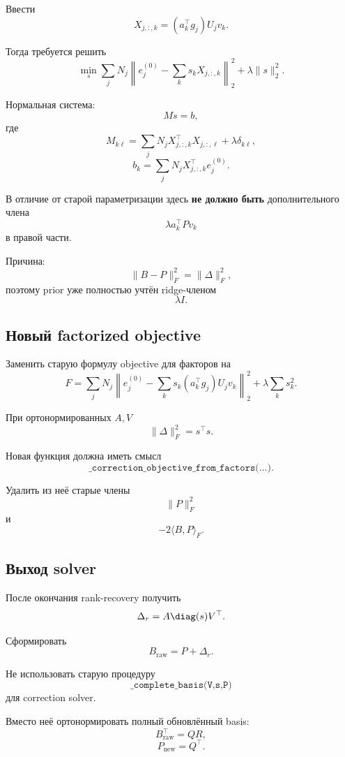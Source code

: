 Ввести
\[
    X_{j,:,k}
    =
    (a_k^\top g_j)U_jv_k.
\]

Тогда требуется решить
\[
\boxed{
    \min_s
    \sum_j
    N_j
    \left\|
        e_j^{(0)}
        -
        \sum_k s_kX_{j,:,k}
    \right\|_2^2
    +
    \lambda\|s\|_2^2.
}
\]

Нормальная система:
\[
\boxed{
    Ms=b,
}
\]
где
\[
    M_{k\ell}
    =
    \sum_j
    N_j
    X_{j,:,k}^\top X_{j,:,\ell}
    +
    \lambda\delta_{k\ell},
\]
\[
\boxed{
    b_k
    =
    \sum_j
    N_j
    X_{j,:,k}^\top e_j^{(0)}.
}
\]

В отличие от старой параметризации здесь
\textbf{не должно быть} дополнительного члена
\[
    \lambda a_k^\top Pv_k
\]
в правой части.

Причина:
\[
    \|B-P\|_F^2
    =
    \|\Delta\|_F^2,
\]
поэтому prior уже полностью учтён ridge-членом
\[
    \lambda I.
\]

\subsection{Новый factorized objective}

Заменить старую формулу objective для факторов на
\[
\boxed{
    F
    =
    \sum_j
    N_j
    \left\|
        e_j^{(0)}
        -
        \sum_k
        s_k
        (a_k^\top g_j)
        U_jv_k
    \right\|_2^2
    +
    \lambda
    \sum_k s_k^2.
}
\]

При ортонормированных $A,V$
\[
    \|\Delta\|_F^2
    =
    s^\top s.
\]

Новая функция должна иметь смысл
\[
\texttt{\_correction\_objective\_from\_factors(...)}.
\]

Удалить из неё старые члены
\[
    \|P\|_F^2
\]
и
\[
    -2\langle B,P\rangle_F.
\]

\subsection{Выход solver}

После окончания rank-recovery получить
\[
    \Delta_r
    =
    A\diag(s)V^\top.
\]

Сформировать
\[
\boxed{
    B_{\mathrm{raw}}
    =
    P+\Delta_r.
}
\]

Не использовать старую процедуру
\[
    \texttt{\_complete\_basis(V,s,P)}
\]
для correction solver.

Вместо неё ортонормировать полный обновлённый basis:
\[
    B_{\mathrm{raw}}^\top
    =
    QR,
\]
\[
\boxed{
    P_{\mathrm{new}}=Q^\top.
}
\]


